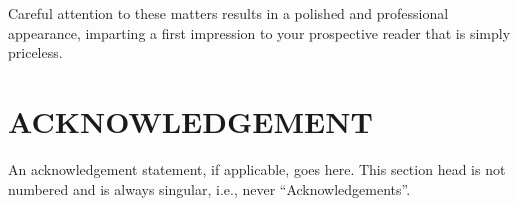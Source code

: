 \documentclass[conference, 10pt]{IEEEtran}
\begin{document}
Careful attention to these matters results in a polished and professional appearance, imparting a first impression to your
prospective reader that is simply priceless.

\section*{ACKNOWLEDGEMENT}
An acknowledgement statement, if applicable, goes here. This section head is not numbered and is always singular, i.e., never ``Acknowledgements''.


%
%



%
%
\end{document}

